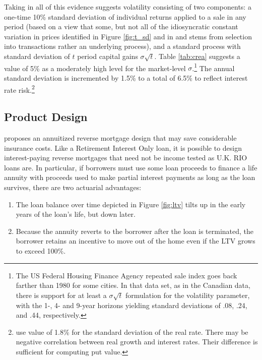 \documentclass[12pt]{article}
\begin{document}
Taking in all of this evidence suggests volatility consisting of two
components: a one-time 10\% standard deviation of individual returns applied to
a sale in any period (based on a view that some, but not all of the
idiosyncratic constant variation in prices identified in Figure \ref{fig:t_sd} and
in \textcite{Sagi} and \textcite{Giacoletti} stems from selection into
transactions rather an underlying process), and a standard process with
standard deviation of $t$ period capital gains $\sigma\sqrt{t}$. Table
\ref{tab:crea} suggests a value of 5\% as a moderately high level for the
market-level $\sigma$.\footnote{The US Federal Housing Finance Agency repeated
sale index goes back farther than 1980 for some cities. In that data set, as in
the Canadian data, there is support for at least a $\sigma\sqrt{t}$ formulation
for the volatility parameter, with the 1-, 4- and 9-year horizons yielding
standard deviations of .08, .24, and .44, respectively.} The annual standard
deviation is incremented by 1.5\% to a total of 6.5\% to reflect interest rate
risk.\footnote{\textcite{CoccoLopes} use value of 1.8\% for the standard
deviation of the real rate. There may be negative correlation between real
growth and interest rates. Their difference is sufficient for computing put
value.}

\subsection{Product Design}

\textcite{DavidoffBrookings} proposes an annuitized reverse mortgage design that
may save considerable insurance costs. Like a Retirement Interest Only loan, it
is possible to design interest-paying reverse mortgages that need not be income
tested as U.K. RIO loans are. In particular, if borrowers must use some loan
proceeds to finance a life annuity with proceeds used to make partial interest
payments as long as the loan survives, there are two actuarial advantages:

\begin{enumerate}
	\item The loan balance over time depicted in Figure \ref{fig:ltv} tilts
		up in the early years of the loan's life, but down later.
	\item Because the annuity reverts to the borrower after the loan is
		terminated, the borrower retains an incentive to move out of
		the home even if the LTV grows to exceed 100\%.
\end{enumerate}
\end{document}
